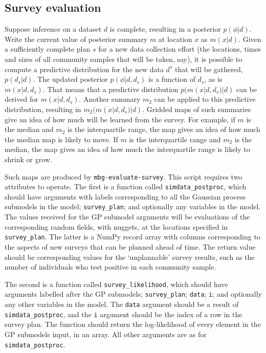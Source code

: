 \subsection{Survey evaluation}
\label{sub:survey-eval} 
Suppose inference on a dataset $d$ is complete, resulting in a posterior $p(\phi|d)$. Write the current value of posterior summary $m$ at location $x$ as $m(x|d)$. Given a sufficiently complete plan $s$ for a new data collection effort (the locations, times and sizes of all community samples that will be taken, say), it is possible to compute a predictive distribution for the new data $d^s$ that will be gathered, $p(d_s|d)$. The updated posterior $p(\phi|d,d_s)$ is a function of $d_s$, as is $m(x|d,d_s)$. That means that a predictive distribution $p(m(x|d,d_s)|d)$ can be derived for $m(x|d,d_s)$.
Another summary $m_2$ can be applied to this predictive distribution, resulting in $m_2(m(x|d,d_s)|d)$. Gridded maps of such summaries give an idea of how much will be learned from the survey. For example, if $m$ is the median and $m_2$ is the interquartile range, the map gives an idea of how much the median map is likely to move. If $m$ is the interquartile range and $m_2$ is the median, the map gives an idea of how much the interquartile range is likely to shrink or grow. 

Such maps are produced by \texttt{mbg-evaluate-survey}. This script requires two attributes to operate. The first is a function called \texttt{simdata\_postproc}, which should have arguments with labels corresponding to all the Gaussian process submodels in the model; \texttt{survey\_plan}; and optionally any variables in the model. The values received for the GP submodel arguments will be evaluations of the corresponding random fields, with nuggets, at the locations specified in \texttt{survey\_plan}. The latter is a NumPy record array with columns corresponding to the aspects of new surveys that can be planned ahead of time. The return value should be corresponding values for the `unplannable' survey results, such as the number of individuals who test positive in each community sample.

The second is a function called \texttt{survey\_likelihood}, which should have arguments labelled after the GP submodels; \texttt{survey\_plan}; \texttt{data}; \texttt{i}; and optionally any other variables in the model. The \texttt{data} argument should be a result of \texttt{simdata\_postproc}, and the \texttt{i} argument should be the index of a row in the survey plan. The function should return the log-likelihood of every element in the GP submodels input, in an array. All other arguments are as for \texttt{simdata\_postproc}.

